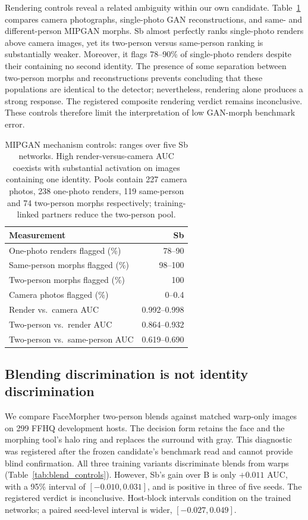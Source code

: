 Rendering controls reveal a related ambiguity within our own candidate. Table~\ref{tab:render_controls} compares camera photographs, single-photo GAN reconstructions, and same- and different-person MIPGAN morphs. Sb almost perfectly ranks single-photo renders above camera images, yet its two-person versus same-person ranking is substantially weaker. Moreover, it flags 78--90\% of single-photo renders despite their containing no second identity. The presence of some separation between two-person morphs and reconstructions prevents concluding that these populations are identical to the detector; nevertheless, rendering alone produces a strong response. The registered composite rendering verdict remains inconclusive. These controls therefore limit the interpretation of low GAN-morph benchmark error.

\begin{table}[t]
\centering\small
\caption{MIPGAN mechanism controls: ranges over five Sb networks. High render-versus-camera AUC coexists with substantial activation on images containing one identity. Pools contain 227 camera photos, 238 one-photo renders, 119 same-person and 74 two-person morphs respectively; training-linked partners reduce the two-person pool.}
\label{tab:render_controls}
\begin{tabular}{lr}
\toprule
Measurement & Sb \\
\midrule
One-photo renders flagged (\%) & 78--90 \\
Same-person morphs flagged (\%) & 98--100 \\
Two-person morphs flagged (\%) & 100 \\
Camera photos flagged (\%) & 0--0.4 \\
Render vs.\ camera AUC & 0.992--0.998 \\
Two-person vs.\ render AUC & 0.864--0.932 \\
Two-person vs.\ same-person AUC & 0.619--0.690 \\
\bottomrule
\end{tabular}
\end{table}

\subsection{Blending discrimination is not identity discrimination}
\label{sec:blend_results}
We compare FaceMorpher two-person blends against matched warp-only images on 299 FFHQ development hosts. The decision form retains the face and the morphing tool's halo ring and replaces the surround with gray. This diagnostic was registered after the frozen candidate's benchmark read and cannot provide blind confirmation. All three training variants discriminate blends from warps (Table~\ref{tab:blend_controls}). However, Sb's gain over B is only $+0.011$ AUC, with a 95\% interval of $[-0.010,0.031]$, and is positive in three of five seeds. The registered verdict is inconclusive. Host-block intervals condition on the trained networks; a paired seed-level interval is wider, $[-0.027,0.049]$.

